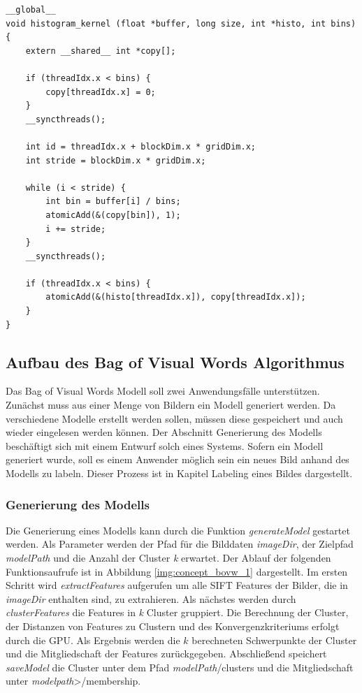 \lstset{language=C}
\begin{lstlisting}
__global__
void histogram_kernel (float *buffer, long size, int *histo, int bins) {
	extern __shared__ int *copy[];
	
	if (threadIdx.x < bins) {
		copy[threadIdx.x] = 0;		
	}
	__syncthreads();

	int id = threadIdx.x + blockDim.x * gridDim.x;
	int stride = blockDim.x * gridDim.x;
	
	while (i < stride) {
		int bin = buffer[i] / bins; 
		atomicAdd(&(copy[bin]), 1);
		i += stride;	
	}
	__syncthreads();
	
	if (threadIdx.x < bins) {
		atomicAdd(&(histo[threadIdx.x]), copy[threadIdx.x]);		
	}
}
\end{lstlisting} 

\subsection{Aufbau des Bag of Visual Words Algorithmus}

Das Bag of Visual Words Modell soll zwei Anwendungsfälle unterstützen. Zunächst muss aus einer Menge von Bildern ein Modell generiert werden. Da verschiedene Modelle erstellt werden sollen, müssen diese gespeichert und auch wieder eingelesen werden können. Der Abschnitt Generierung des Modells beschäftigt sich mit einem Entwurf solch eines Systems. Sofern ein Modell generiert wurde, soll es einem Anwender möglich sein ein neues Bild anhand des Modells zu labeln. Dieser Prozess ist in Kapitel Labeling eines Bildes dargestellt.

\subsubsection{Generierung des Modells}

Die Generierung eines Modells kann durch die Funktion \textit{generateModel} gestartet werden. Als Parameter werden der Pfad für die Bilddaten \textit{imageDir}, der Zielpfad \textit{modelPath} und die Anzahl der Cluster \textit{k} erwartet. Der Ablauf der folgenden Funktionsaufrufe ist in Abbildung \ref{img:concept_bovw_1} dargestellt. Im ersten Schritt wird \textit{extractFeatures} aufgerufen um alle SIFT Features der Bilder, die in \textit{imageDir} enthalten sind, zu extrahieren. Als nächstes werden durch \textit{clusterFeatures} die Features in \textit{k} Cluster gruppiert. Die Berechnung der Cluster, der Distanzen von Features zu Clustern und des Konvergenzkriteriums erfolgt durch die GPU. Als Ergebnis werden die $k$ berechneten Schwerpunkte der Cluster und die Mitgliedschaft der Features zurückgegeben. Abschließend speichert \textit{saveModel} die Cluster unter dem Pfad  \textit{modelPath}/clusters und die Mitgliedschaft unter \textit{modelpath}>/membership. 


